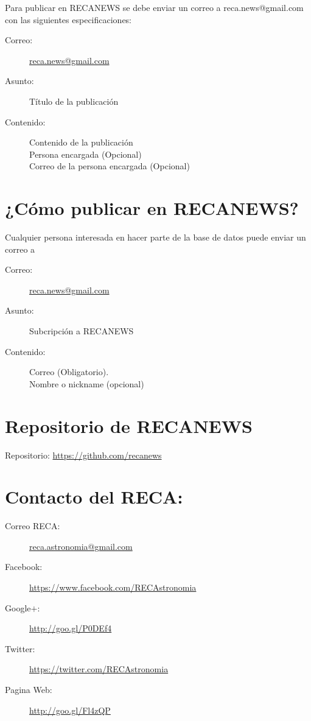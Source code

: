 \documentclass{book}
\begin{document}
Para publicar en RECANEWS se debe enviar un correo a reca.news@gmail.com con las siguientes especificaciones:
\begin{description}
\item[Correo:]\url{reca.news@gmail.com}
\item[Asunto:]Título de la publicación
\item[Contenido:]Contenido de la publicación\\
Persona encargada (Opcional)\\
Correo de la persona encargada (Opcional)
\end{description}
  

\section*{¿Cómo publicar en RECANEWS?}

Cualquier persona interesada en hacer parte de la base de datos puede enviar un correo a 
\begin{description}
\item[Correo:]\url{reca.news@gmail.com}
\item[Asunto:]Subcripción a RECANEWS
\item[Contenido:]Correo (Obligatorio).\\
Nombre o nickname (opcional)
\end{description}

\section*{Repositorio de RECANEWS}

Repositorio: \url{https://github.com/recanews}\\



\section*{Contacto del RECA:}

\begin{description}
\item[Correo RECA:]\url{reca.astronomia@gmail.com}
\item[Facebook:] \url{https://www.facebook.com/RECAstronomia}
\item[Google$+$:] \url{http://goo.gl/P0DEf4}
\item[Twitter:] \url{https://twitter.com/RECAstronomia}
\item[Pagina Web:] \url{http://goo.gl/Fl4zQP}
\end{description}
\end{document}
